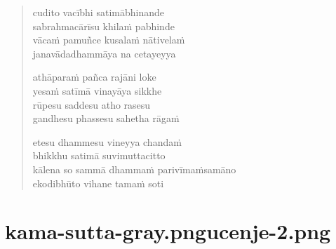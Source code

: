 \begin{verse}
cudito vacībhi satimābhinande\\
sabrahmacārīsu khilaṁ pabhinde\\
vācaṁ pamuñce kusalaṁ nātivelaṁ\\
janavādadhammāya na cetayeyya

athāparaṁ pañca rajāni loke\\
yesaṁ satīmā vinayāya sikkhe\\
rūpesu saddesu atho rasesu\\
gandhesu phassesu sahetha rāgaṁ

etesu dhammesu vineyya chandaṁ\\
bhikkhu satimā suvimuttacitto\\
kālena so sammā dhammaṁ parivīmaṁsamāno\\
ekodibhūto vihane tamaṁ soti

\end{verse}


\chapter[Sāriputta Sutta]{{kama-sutta-gray.png}{ucenje-2.png}}


